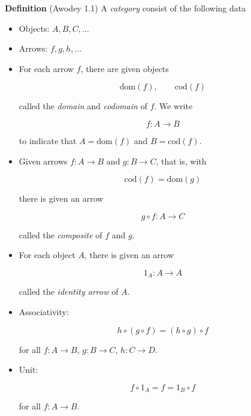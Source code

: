 \documentclass{article}
\begin{document}
\begin{definition}[Awodey 1.1]\textbf{Definition} (Awodey 1.1)
A \emph{category} consist of the following data
\begin{itemize}
\item Objects: $A, B, C, \ldots$
\item Arrows: $f, g, h, \ldots$

\item For each arrow $f$, there are given objects

\begin{equation*}
\mathrm{dom}(f), \qquad \mathrm{cod}(f)
\end{equation*}

called the \emph{domain} and \emph{codomain} of $f$. We write

\begin{equation*}
f : A \to B
\end{equation*}

to indicate that $A = \mathrm{dom}(f)$ and $B = \mathrm{cod}(f)$.

\item Given arrows $f : A \to B$ and $g : B \to C$, that is, with

\begin{equation*}
\mathrm{cod}(f) = \mathrm{dom}(g)
\end{equation*}

there is given an arrow

\begin{equation*}
g \circ f : A \to C
\end{equation*}

called the \emph{composite} of $f$ and $g$.

\item For each object $A$, there is given an arrow

\begin{equation*}
1_A : A \to A
\end{equation*}

called the \emph{identity arrow} of $A$.

\item Associativity:

\begin{equation*}
h \circ (g \circ f) = (h \circ g) \circ f
\end{equation*}

for all $f : A \to B$, $g : B \to C$, $h : C \to D$.

\item Unit:

\begin{equation*}
f \circ 1_A = f = 1_B \circ f
\end{equation*}

for all $f : A \to B$.
\end{itemize}
\end{definition}
\end{document}
